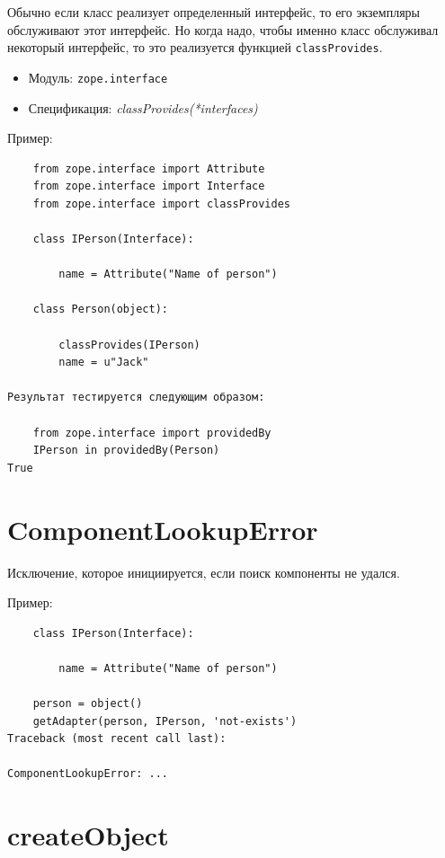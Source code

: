 \documentclass[a4paper,openany,twoside,final]{book}
\providecommand*{\DUroletitlereference}[1]{\textsl{#1}}
\begin{document}
Обычно если класс реализует определенный интерфейс, то его экземпляры обслуживают этот интерфейс.  Но когда надо, чтобы именно класс обслуживал некоторый интерфейс, то это реализуется функцией \texttt{classProvides}.

\begin{itemize}

\item Модуль: \texttt{zope.interface}

\item Спецификация: \DUroletitlereference{classProvides(*interfaces)}

\end{itemize}

Пример:

\begin{verbatim}
    from zope.interface import Attribute
    from zope.interface import Interface
    from zope.interface import classProvides

    class IPerson(Interface):

        name = Attribute("Name of person")

    class Person(object):

        classProvides(IPerson)
        name = u"Jack"

Результат тестируется следующим образом:

    from zope.interface import providedBy
    IPerson in providedBy(Person)
True
\end{verbatim}


\section*{ComponentLookupError%
  \label{componentlookuperror}%
}

Исключение, которое инициируется, если поиск компоненты не удался.

Пример:

\begin{verbatim}
    class IPerson(Interface):

        name = Attribute("Name of person")

    person = object()
    getAdapter(person, IPerson, 'not-exists')
Traceback (most recent call last):

ComponentLookupError: ...
\end{verbatim}


\section*{createObject%
  \label{createobject}%
}
\end{document}
